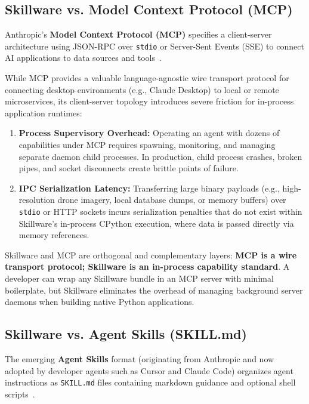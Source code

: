\subsection{Skillware vs. Model Context Protocol (MCP)}
\label{subsec:comp_mcp}

Anthropic's \textbf{Model Context Protocol (MCP)} specifies a client-server architecture using JSON-RPC over \texttt{stdio} or Server-Sent Events (SSE) to connect AI applications to data sources and tools~\cite{anthropic2024mcp}.

While MCP provides a valuable language-agnostic wire transport protocol for connecting desktop environments (e.g., Claude Desktop) to local or remote microservices, its client-server topology introduces severe friction for in-process application runtimes:
\begin{enumerate}[leftmargin=*]
  \item \textbf{Process Supervisory Overhead:} Operating an agent with dozens of capabilities under MCP requires spawning, monitoring, and managing separate daemon child processes. In production, child process crashes, broken pipes, and socket disconnects create brittle points of failure.
  \item \textbf{IPC Serialization Latency:} Transferring large binary payloads (e.g., high-resolution drone imagery, local database dumps, or memory buffers) over \texttt{stdio} or HTTP sockets incurs serialization penalties that do not exist within Skillware's in-process CPython execution, where data is passed directly via memory references.
\end{enumerate}

Skillware and MCP are orthogonal and complementary layers: \textbf{MCP is a wire transport protocol; Skillware is an in-process capability standard}. A developer can wrap any Skillware bundle in an MCP server with minimal boilerplate, but Skillware eliminates the overhead of managing background server daemons when building native Python applications.

\subsection{Skillware vs. Agent Skills (SKILL.md)}
\label{subsec:comp_agentskills}

The emerging \textbf{Agent Skills} format (originating from Anthropic and now adopted by developer agents such as Cursor and Claude Code) organizes agent instructions as \texttt{SKILL.md} files containing markdown guidance and optional shell scripts~\cite{agentskills2024standards}.


